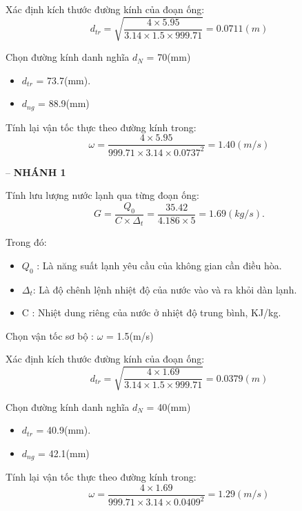 Xác định kích thước đường kính của đoạn ống:
\begin{equation*}
	d_{tr} = \sqrt{\dfrac{4 \times 5.95}{3.14 \times 1.5 \times 999.71}} = 0.0711(m)
\end{equation*}

Chọn đường kính danh nghĩa $d_{N}$ = 70(mm)
\begin{itemize}
	\item $d_{tr}$ = 73.7(mm).
	\item $d_{ng}$ = 88.9(mm)
\end{itemize}

Tính lại vận tốc thực theo đường kính trong:
\begin{equation*}
	\omega = \dfrac{4 \times 5.95 }{999.71 \times 3.14 \times 0.0737^{2}} = 1.40(m/s)
\end{equation*}

-- \textbf{NHÁNH 1}

Tính lưu lượng nước lạnh qua từng đoạn ống:
\begin{equation*}
	G = \dfrac{Q_{0}}{C \times \Delta_{t}} =\dfrac{35.42}{4.186 \times 5} = 1.69(kg/s).
\end{equation*}

Trong đó:
\begin{itemize}
	\item $Q_{0}$ : Là năng suất lạnh yêu cầu của không gian cần điều hòa.
	\item $\Delta_{t}$: Là độ chênh lệnh nhiệt độ của nước vào và ra khỏi dàn lạnh.
	\item C : Nhiệt dung riêng của nước ở nhiệt độ trung bình, KJ/kg.
\end{itemize}

Chọn vận tốc sơ bộ : $\omega$ = 1.5(m/s)

Xác định kích thước đường kính của đoạn ống:
\begin{equation*}
	d_{tr} = \sqrt{\dfrac{4 \times 1.69}{3.14 \times 1.5 \times 999.71}} = 0.0379(m)
\end{equation*}

Chọn đường kính danh nghĩa $d_{N}$ = 40(mm)
\begin{itemize}
	\item $d_{tr}$ = 40.9(mm).
	\item $d_{ng}$ = 42.1(mm)
\end{itemize}

Tính lại vận tốc thực theo đường kính trong:
\begin{equation*}
	\omega = \dfrac{4 \times 1.69 }{999.71 \times 3.14 \times 0.0409^{2}} = 1.29(m/s)
\end{equation*}

